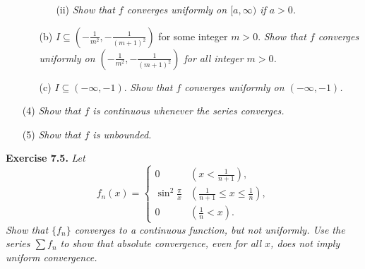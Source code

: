 \documentclass{article}
\begin{document}
\begin{enumerate}
\begin{enumerate}
\begin{enumerate}
        \item[(ii)]
          \emph{Show that $f$ converges uniformly on $[a,\infty)$ if $a > 0$.}
      \end{enumerate}

    \item[(b)]
      $I \subseteq \left(-\frac{1}{m^2}, -\frac{1}{(m+1)^2}\right)$
      for some integer $m > 0$.
      \emph{Show that $f$ converges uniformly on
      $\left(-\frac{1}{m^2}, -\frac{1}{(m+1)^2}\right)$ for all integer $m > 0$.}

    \item[(c)]
      $I \subseteq (-\infty,-1)$.
      \emph{Show that $f$ converges uniformly on $(-\infty,-1)$.}

  \end{enumerate}

\item[(4)]
  \emph{Show that $f$ is continuous whenever the series converges.}

\item[(5)]
  \emph{Show that $f$ is unbounded.}
\end{enumerate}







\textbf{Exercise 7.5.}
\emph{Let
\begin{equation*}
  f_n(x) =
    \begin{cases}
      0                    & (x < \frac{1}{n+1}), \\
      \sin^2 \frac{\pi}{x} & (\frac{1}{n+1} \leq x \leq \frac{1}{n}), \\
      0                    & (\frac{1}{n} < x).
    \end{cases}
\end{equation*}
Show that $\{f_n\}$ converges to a continuous function, but not uniformly.
Use the series $\sum f_n$ to show that absolute convergence, even for all $x$,
does not imply uniform convergence.} \\
\end{document}
